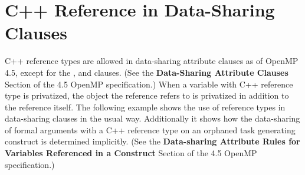 \section{C++ Reference in Data-Sharing Clauses}
\label{cpp_reference}

C++ reference types are allowed in data-sharing attribute clauses as of OpenMP 4.5, except
for the ,  and  clauses.  
(See the \textbf{Data-Sharing Attribute Clauses} Section of the 4.5 OpenMP specification.)
When a variable with C++ reference type is privatized, the object the reference refers to is privatized in addition to the reference itself.
The following example shows the use of reference types in data-sharing clauses in the usual way.
Additionally it shows how the data-sharing of formal arguments with a C++ reference type on an orphaned task generating construct is determined implicitly. (See the \textbf{Data-sharing Attribute Rules for Variables Referenced in a Construct} Section of the 4.5 OpenMP specification.)


